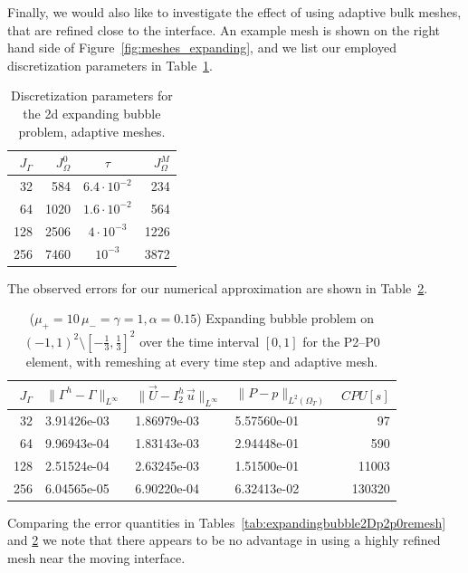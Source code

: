\documentclass[a4paper,11pt,onecolumn]{article}
\newcommand{\errorXx}{\|\Gamma^h - \Gamma\|_{L^\infty}}
\newcommand{\errorUu}[1]{\|\vec U - I^h_{#1}\,\vec u\|_{L^\infty}}
\newcommand{\LerrorPp}{\|P - p\|_{L^2(\Omega_T)}}
\begin{document}
Finally, we would also like to investigate the effect of using adaptive bulk
meshes, that are refined close to the interface. An example mesh is shown on
the right hand side of Figure~\ref{fig:meshes_expanding}, and we list our
employed discretization parameters in
Table~\ref{tab:expandingbubble2Delements_adaptive}.
\begin{table}
\center
\begin{tabular}{rrcr}
\hline
$J_\Gamma$ & $J_\Omega^0$ & $\tau$ & $J_\Omega^M$ \\
\hline
 32 &  584 & $6.4\cdot10^{-2}$ &  234 \\
 64 & 1020 & $1.6\cdot10^{-2}$ &  564 \\
128 & 2506 &   $4\cdot10^{-3}$ & 1226 \\
256 & 7460 &         $10^{-3}$ & 3872 \\
\hline
\end{tabular}
\caption{Discretization parameters for the 2d expanding bubble problem,
adaptive meshes.}
\label{tab:expandingbubble2Delements_adaptive}
\end{table}
The observed errors for our numerical approximation are shown in
Table~\ref{tab:expandingbubble2Dp2p0adaptive}.
\begin{table}
 \center
\begin{tabular}{rlllr}
\hline
$J_\Gamma$ & $\errorXx$ & $\errorUu2$ & $\LerrorPp$ & $CPU[s]$\\
\hline
 32 & 3.91426e-03 & 1.86979e-03 & 5.57560e-01 &     97 \\
 64 & 9.96943e-04 & 1.83143e-03 & 2.94448e-01 &    590 \\
128 & 2.51524e-04 & 2.63245e-03 & 1.51500e-01 &  11003 \\
256 & 6.04565e-05 & 6.90220e-04 & 6.32413e-02 & 130320 \\
\hline
\end{tabular}
\caption{($\mu_+ = 10\,\mu_- = \gamma = 1,\alpha = 0.15$) Expanding bubble
problem on $(-1,1)^2\setminus[-\frac{1}{3},\frac{1}{3}]^2$ over the time
interval $[0,1]$ for the P2--P0 element, with remeshing at every time step and
adaptive mesh.}
\label{tab:expandingbubble2Dp2p0adaptive}
\end{table}
Comparing the error quantities in Tables~\ref{tab:expandingbubble2Dp2p0remesh}
and \ref{tab:expandingbubble2Dp2p0adaptive} we note that there appears to be no
advantage in using a highly refined mesh near the moving interface.
\end{document}
